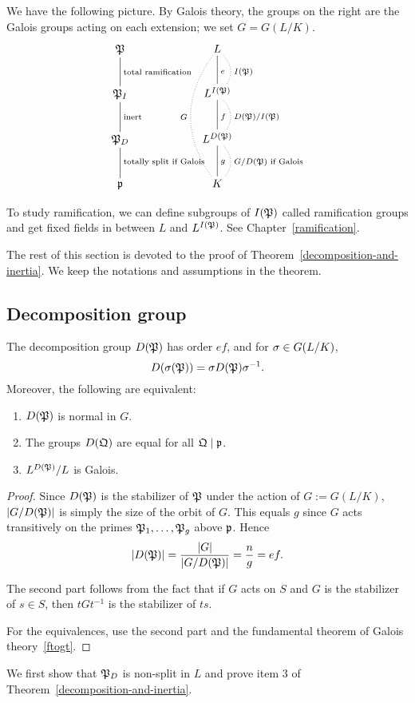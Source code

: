 We have the following picture. By Galois theory, the groups on the right are the Galois groups acting on each extension; we set $G=G(L/K)$.
\[
\xymatrixcolsep{5pc}\xymatrix{
\mP\ar@{-}[d]^{\text{total ramification}} &
L\ar@{-}[d]^{e}\ar@/^1pc/@{.}[d]^{I(\mP)}
\ar@/_2pc/@{.}[ddd]_{G}\\
\mP_I\ar@{-}[d]^{\text{inert}} &
L^{I(\mP)}\ar@{-}[d]^f\ar@/^1pc/@{.}[d]^{D(\mP)/I(\mP)}\\
\mP_D\ar@{-}[d]^{\text{totally split if Galois}}&
L^{D(\mP)}\ar@{-}[d]^g\ar@/^1pc/@{.}[d]^{G/D(\mP)\text{ if Galois}}\\
\mfp&K
}
\]
\begin{rem}
To study ramification, we can define subgroups of $I(\mathfrak{P})$ called ramification groups and get fixed fields in between $L$ and $L^{I(\mathfrak{P})}$. See Chapter~\ref{ramification}.
\end{rem}
The rest of this section is devoted to the proof of Theorem~\ref{decomposition-and-inertia}. We keep the notations and assumptions in the theorem.
\subsection{Decomposition group}
\begin{pr}
The decomposition group $D(\mathfrak{P})$ has order $ef$, and for $\sigma\in G(L/K)$,
\[
D(\sigma(\mathfrak{P}))=\sigma D(\mathfrak{P}) \sigma^{-1}.
\]
Moreover, the following are equivalent:
\begin{enumerate}
\item $D(\mathfrak{P})$ is normal in $G$.
\item The groups $D(\mathfrak{Q})$ are equal for all $\mathfrak{Q}\mid \mathfrak{p}$.
\item $L^{D(\mathfrak{P})}/L$ is Galois.
\end{enumerate}
\end{pr}
\begin{proof}
 Since $D(\mathfrak{P})$ is the stabilizer of $\mathfrak{P}$ under the action of $G:=G(L/K)$,  
$|G/D(\mathfrak{P})|$ is simply the size of the orbit of $G$. This equals $g$ since $G$ acts transitively on the primes $\mathfrak{P}_1,\ldots, \mathfrak{P}_g$ above $\mathfrak{p}$.
Hence
\[
|D(\mathfrak{P})|=\frac{|G|}{|G/D(\mathfrak{P})|}=\frac{n}{g}=ef.
\]

The second part follows from the fact that if $G$ acts on $S$ and $G$ is the stabilizer of $s\in S$, then $tGt^{-1}$ is the stabilizer of $ts$.

For the equivalences, use the second part and the fundamental theorem of Galois theory~\ref{ftogt}.
\end{proof}
We first show that $\mathfrak{P}_D$ is non-split in $L$ and prove item 3 of Theorem~\ref{decomposition-and-inertia}.

